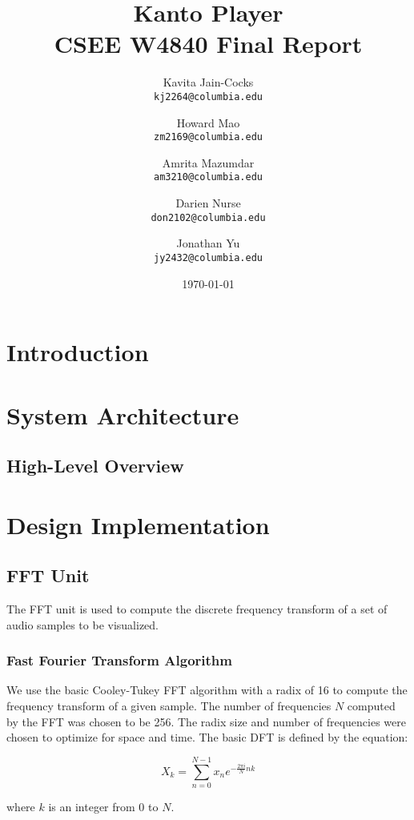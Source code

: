 \documentclass{article}
\title{Kanto Player \\
CSEE W4840 Final Report}
\author{
  Kavita Jain-Cocks\\
  \texttt{kj2264@columbia.edu}
  \and
  Howard Mao\\
  \texttt{zm2169@columbia.edu}
  \and
  Amrita Mazumdar\\
  \texttt{am3210@columbia.edu}
  \and
  Darien Nurse\\
  \texttt{don2102@columbia.edu}
  \and
  Jonathan Yu\\
  \texttt{jy2432@columbia.edu}
   \\}
\date{\today}
\begin{document}
\maketitle
\newpage


\section{Introduction}

\section{System Architecture}

\subsection{High-Level Overview}

\section{Design Implementation}
\subsection{FFT Unit}
The FFT unit is used to compute the discrete frequency transform of a set of audio
samples to be visualized. 

	\subsubsection{Fast Fourier Transform Algorithm}
	We use the basic Cooley-Tukey FFT algorithm with a radix of 16 to compute the
	frequency transform of a given sample. The number of frequencies $N$ computed by 
	the FFT was chosen to be 256. The radix size and number of frequencies were chosen 
	to optimize for 	space and time. The basic DFT is defined by the equation:
	
	$$
	 X_k = \sum_{n=0}^{N-1} x_n e^{-\frac{2\pi i}{N} nk}
	$$ 
	
	where $k$ is an integer from 0 to $N$. 
	
\end{document}
